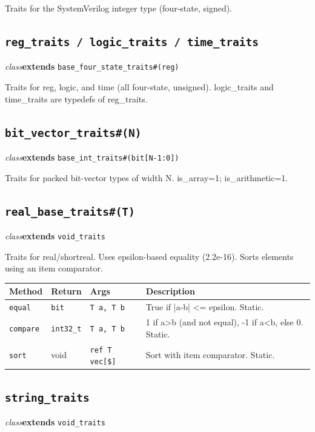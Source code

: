 \documentclass[11pt,letterpaper]{report}
\begin{document}
Traits for the SystemVerilog integer type (four-state, signed).


\subsection*{\texttt{reg\_traits / logic\_traits / time\_traits}}
\noindent\small\textit{class}\quad \textbf{extends} \texttt{base\_four\_state\_traits\#(reg)}\par

Traits for reg, logic, and time (all four-state, unsigned). logic\_traits and time\_traits are typedefs of reg\_traits.


\subsection*{\texttt{bit\_vector\_traits\#(N)}}
\noindent\small\textit{class}\quad \textbf{extends} \texttt{base\_int\_traits\#(bit[N-1:0])}\par

Traits for packed bit-vector types of width N. is\_array=1; is\_arithmetic=1.


\subsection*{\texttt{real\_base\_traits\#(T)}}
\noindent\small\textit{class}\quad \textbf{extends} \texttt{void\_traits}\par

Traits for real/shortreal. Uses epsilon-based equality (2.2e-16). Sorts elements using an item comparator.

\begin{xltabular}{\linewidth}{>{\small}p{1.35in} >{\small}p{1.25in} >{\small}p{0.95in} >{\small}X}
\toprule
\textbf{Method} & \textbf{Return} & \textbf{Args} & \textbf{Description} \\
\midrule
\endhead
\bottomrule
\endfoot
\texttt{equal} & \texttt{bit} & \texttt{T a, T b} & True if |a-b| \textless{}= epsilon. Static. \\
\texttt{compare} & \texttt{int32\_t} & \texttt{T a, T b} & 1 if a\textgreater{}b (and not equal), -1 if a\textless{}b, else 0. Static. \\
\texttt{sort} & void & \texttt{ref T vec[\$]} & Sort with item comparator. Static. \\
\end{xltabular}

\subsection*{\texttt{string\_traits}}
\noindent\small\textit{class}\quad \textbf{extends} \texttt{void\_traits}\par
\end{document}
